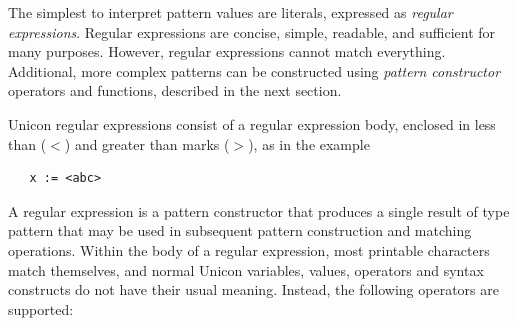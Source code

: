 \documentclass[letterpaper,12pt]{article}
\begin{document}
The simplest to interpret pattern values are literals, expressed as
{\em regular expressions\/}. Regular expressions are concise, simple,
readable, and sufficient for many purposes.
However, regular expressions cannot match
everything. Additional, more complex patterns can be constructed using
{\em pattern constructor\/} operators and functions, described in the
next section.

Unicon regular expressions consist of a regular expression body,
enclosed in less than ({\tt $<$}) and greater than marks ({\tt $>$}),
as in the example

\begin{verbatim}
   x := <abc>
\end{verbatim}

A regular expression is a pattern constructor that produces a single
result of type pattern that may be used in subsequent pattern
construction and matching operations.  Within the body of a regular
expression, most printable characters match themselves, and normal
Unicon variables, values, operators and syntax constructs do not have
their usual meaning. Instead, the following operators are supported:
\end{document}
